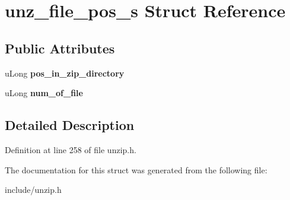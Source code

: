\hypertarget{structunz__file__pos__s}{\section{unz\-\_\-file\-\_\-pos\-\_\-s Struct Reference}
\label{structunz__file__pos__s}
}
\subsection*{Public Attributes}
\begin{DoxyCompactItemize}
\item 
\hypertarget{structunz__file__pos__s_a87d193346d3825363f899f574a2f3cb2}{u\-Long {\bfseries pos\-\_\-in\-\_\-zip\-\_\-directory}}\label{structunz__file__pos__s_a87d193346d3825363f899f574a2f3cb2}

\item 
\hypertarget{structunz__file__pos__s_a771dc0b7dba811b6174382f87f6800fc}{u\-Long {\bfseries num\-\_\-of\-\_\-file}}\label{structunz__file__pos__s_a771dc0b7dba811b6174382f87f6800fc}

\end{DoxyCompactItemize}


\subsection{Detailed Description}


Definition at line 258 of file unzip.\-h.



The documentation for this struct was generated from the following file\-:\begin{DoxyCompactItemize}
\item 
include/unzip.\-h\end{DoxyCompactItemize}
